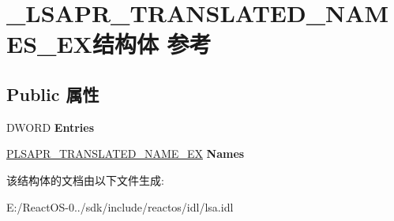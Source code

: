 \hypertarget{struct___l_s_a_p_r___t_r_a_n_s_l_a_t_e_d___n_a_m_e_s___e_x}{}\section{\+\_\+\+L\+S\+A\+P\+R\+\_\+\+T\+R\+A\+N\+S\+L\+A\+T\+E\+D\+\_\+\+N\+A\+M\+E\+S\+\_\+\+E\+X结构体 参考}
\label{struct___l_s_a_p_r___t_r_a_n_s_l_a_t_e_d___n_a_m_e_s___e_x}
\subsection*{Public 属性}
\begin{DoxyCompactItemize}
\item 
\mbox{\label{struct___l_s_a_p_r___t_r_a_n_s_l_a_t_e_d___n_a_m_e_s___e_x_a8a530681b1491b58927f94b0714cd9c5}} 
D\+W\+O\+RD {\bfseries Entries}
\item 
\mbox{\label{struct___l_s_a_p_r___t_r_a_n_s_l_a_t_e_d___n_a_m_e_s___e_x_a7b78ab559a1260a4b8409afc7b116c53}} 
\hyperlink{struct___l_s_a_p_r___t_r_a_n_s_l_a_t_e_d___n_a_m_e___e_x}{P\+L\+S\+A\+P\+R\+\_\+\+T\+R\+A\+N\+S\+L\+A\+T\+E\+D\+\_\+\+N\+A\+M\+E\+\_\+\+EX} {\bfseries Names}
\end{DoxyCompactItemize}


该结构体的文档由以下文件生成\+:\begin{DoxyCompactItemize}
\item 
E\+:/\+React\+O\+S-\/0../sdk/include/reactos/idl/lsa.\+idl\end{DoxyCompactItemize}
